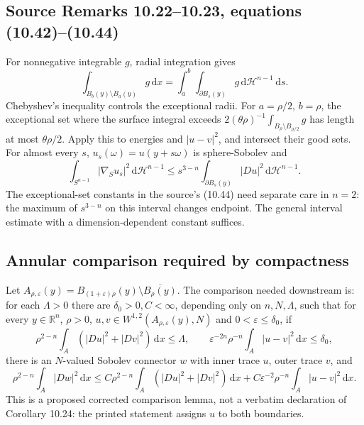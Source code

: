 \documentclass[11pt,a4paper]{article}
\numberwithin{equation}{section}
\theoremstyle{definition}
\theoremstyle{remark}
\newcommand{\R}{\mathbb R}
\newcommand{\HH}{\mathcal H}
\newcommand{\dd}{\,\mathrm d}
\begin{document}
\subsection{Source Remarks 10.22--10.23, equations (10.42)--(10.44)}
\label{lem:good-radius}
For nonnegative integrable $g$, radial integration gives
\[
 \int_{B_b(y)\setminus B_a(y)}g\dd x
 =\int_a^b\int_{\partial B_s(y)}g\dd\HH^{n-1}\dd s.
\]
Chebyshev's inequality controls the exceptional radii. For $a=\rho/2$,
$b=\rho$, the exceptional set where the surface integral exceeds
$2(\theta\rho)^{-1}\int_{B_\rho\setminus B_{\rho/2}}g$ has length at
most $\theta\rho/2$. Apply this to energies and $|u-v|^2$, and intersect
their good sets. For almost every $s$, $u_s(\omega)=u(y+s\omega)$ is
sphere-Sobolev and
\begin{equation}\label{eq:spherical-scaling}
 \int_{S^{n-1}}|\nabla_Su_s|^2\dd\HH^{n-1}
 \le s^{3-n}\int_{\partial B_s(y)}|Du|^2\dd\HH^{n-1}.
\end{equation}
The exceptional-set constants in the source's (10.44) need separate care
in $n=2$: the maximum of $s^{3-n}$ on this interval changes endpoint.
The general interval estimate with a dimension-dependent constant suffices.

\subsection{Annular comparison required by compactness}
\label{lem:annular-gluing}
Let $A_{\rho,\varepsilon}(y)=B_{(1+\varepsilon)\rho}(y)
\setminus\overline{B_\rho(y)}$. The comparison needed downstream is:
for each $\Lambda>0$ there are $\delta_0>0,C<\infty$, depending only
on $n,N,\Lambda$, such that for every $y\in\R^n$, $\rho>0$,
$u,v\in W^{1,2}(A_{\rho,\varepsilon}(y),N)$ and
$0<\varepsilon\le\delta_0$, if
\[
 \rho^{2-n}\int_A(|Du|^2+|Dv|^2)\dd x\le\Lambda,\qquad
 \varepsilon^{-2n}\rho^{-n}\int_A|u-v|^2\dd x\le\delta_0,
\]
there is an $N$-valued Sobolev connector $w$ with inner trace $u$,
outer trace $v$, and
\begin{equation}\label{eq:annular-energy}
 \rho^{2-n}\int_A|Dw|^2\dd x
 \le C\rho^{2-n}\int_A(|Du|^2+|Dv|^2)\dd x
 +C\varepsilon^{-2}\rho^{-n}\int_A|u-v|^2\dd x.
\end{equation}
This is a proposed corrected comparison lemma, not a verbatim declaration
of Corollary 10.24: the printed statement assigns $u$ to both boundaries.
\end{document}
